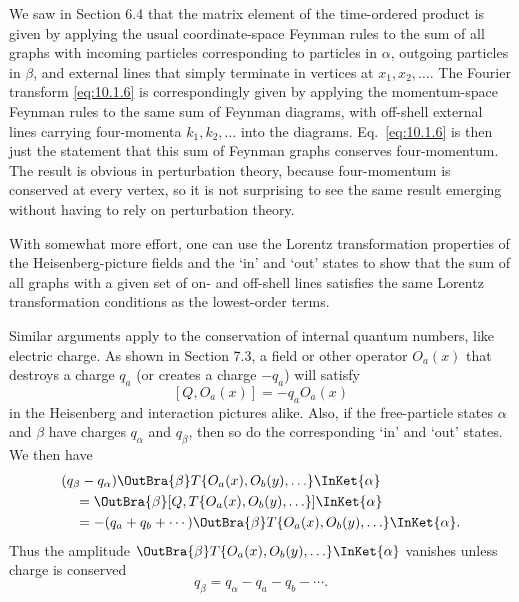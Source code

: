 We saw in Section 6.4 that the matrix element of the time-ordered product
is given by applying the usual coordinate-space Feynman rules to the sum
of all graphs with incoming particles corresponding to particles in $\alpha$,
outgoing particles in $\beta$, and external lines that simply terminate in vertices
at $x_1,x_2,\ldots$. The Fourier transform \eqref{eq:10.1.6} is correspondingly given
by applying the momentum-space Feynman rules to the same sum of
Feynman diagrams, with off-shell external lines carrying four-momenta
$k_1,k_2,\ldots$ into the diagrams. Eq.~\eqref{eq:10.1.6} is then just the statement that
this sum of Feynman graphs conserves four-momentum. The result is
obvious in perturbation theory, because four-momentum is conserved at
every vertex, so it is not surprising to see the same result emerging without
having to rely on perturbation theory.

With somewhat more effort, one can use the Lorentz transformation
properties of the Heisenberg-picture fields and the `in' and `out' states to
show that the sum of all graphs with a given set of on- and off-shell lines
satisfies the same Lorentz transformation conditions as the lowest-order
terms.

Similar arguments apply to the conservation of internal quantum numbers,
like electric charge. As shown in Section 7.3, a field or other operator
$O_a(x)$ that destroys a charge $q_a$ (or creates a charge $-q_a$) will satisfy
\[
  [Q,O_a(x)]=-q_aO_a(x)
\]
in the Heisenberg and interaction pictures alike. Also, if the free-particle
states $\alpha$ and $\beta$ have charges $q_\alpha$ and $q_\beta$, then so do the corresponding `in'
and `out' states. We then have
\begin{align*}
  &(q_\beta-q_\alpha)
  \OutBra{\beta}
  T\{O_a(x),O_b(y),\ldots\}
  \InKet{\alpha}
  \\
  &\quad=\OutBra{\beta}
  [Q,T\{O_a(x),O_b(y),\ldots\}]
  \InKet{\alpha}
  \\
  &\quad=-(q_a+q_b+\cdots)
  \OutBra{\beta}
  T\{O_a(x),O_b(y),\ldots\}
  \InKet{\alpha}.
\end{align*}
Thus the amplitude
$\OutBra{\beta}T\{O_a(x),O_b(y),\ldots\}\InKet{\alpha}$
vanishes unless charge is conserved
\begin{equation}
  q_\beta=q_\alpha-q_a-q_b-\cdots.
  \tag{10.1.7}\label{eq:10.1.7}
\end{equation}


